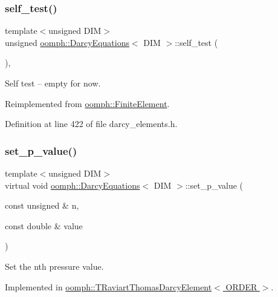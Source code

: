 \subsubsection{\texorpdfstring{self\+\_\+test()}{self\_test()}}
{\footnotesize\ttfamily template$<$unsigned D\+IM$>$ \\
unsigned \hyperlink{classoomph_1_1DarcyEquations}{oomph\+::\+Darcy\+Equations}$<$ D\+IM $>$\+::self\+\_\+test (\begin{DoxyParamCaption}{ }\end{DoxyParamCaption})\hspace{0.3cm}{\ttfamily [inline]}, {\ttfamily [virtual]}}



Self test -- empty for now. 



Reimplemented from \hyperlink{classoomph_1_1FiniteElement_af94c5a5e22175d5420b33b3b79e46ed3}{oomph\+::\+Finite\+Element}.



Definition at line 422 of file darcy\+\_\+elements.\+h.

\mbox{\label{classoomph_1_1DarcyEquations_a7c950999d5108350bd8a44f4ab286b2c}} 
\subsubsection{\texorpdfstring{set\+\_\+p\+\_\+value()}{set\_p\_value()}}
{\footnotesize\ttfamily template$<$unsigned D\+IM$>$ \\
virtual void \hyperlink{classoomph_1_1DarcyEquations}{oomph\+::\+Darcy\+Equations}$<$ D\+IM $>$\+::set\+\_\+p\+\_\+value (\begin{DoxyParamCaption}\item[{const unsigned \&}]{n,  }\item[{const double \&}]{value }\end{DoxyParamCaption})\hspace{0.3cm}{\ttfamily [pure virtual]}}



Set the nth pressure value. 



Implemented in \hyperlink{classoomph_1_1TRaviartThomasDarcyElement_a8ea07dc74e56f09716e7d556aee30d01}{oomph\+::\+T\+Raviart\+Thomas\+Darcy\+Element$<$ O\+R\+D\+E\+R $>$}.



